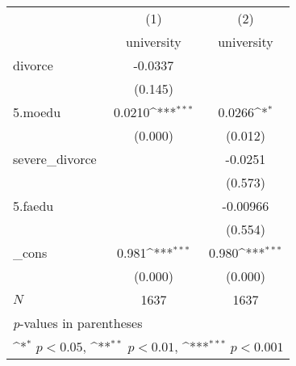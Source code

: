 {
\def\sym#1{\ifmmode^{#1}\else\(^{#1}\)\fi}
\begin{tabular}{l*{2}{c}}
\hline\hline
            &\multicolumn{1}{c}{(1)}&\multicolumn{1}{c}{(2)}\\
            &\multicolumn{1}{c}{university}&\multicolumn{1}{c}{university}\\
\hline
divorce     &     -0.0337         &                     \\
            &     (0.145)         &                     \\
[1em]
5.moedu     &      0.0210\sym{***}&      0.0266\sym{*}  \\
            &     (0.000)         &     (0.012)         \\
[1em]
severe\_divorce&                     &     -0.0251         \\
            &                     &     (0.573)         \\
[1em]
5.faedu     &                     &    -0.00966         \\
            &                     &     (0.554)         \\
[1em]
\_cons      &       0.981\sym{***}&       0.980\sym{***}\\
            &     (0.000)         &     (0.000)         \\
\hline
\(N\)       &        1637         &        1637         \\
\hline\hline
\multicolumn{3}{l}{\footnotesize \textit{p}-values in parentheses}\\
\multicolumn{3}{l}{\footnotesize \sym{*} \(p<0.05\), \sym{**} \(p<0.01\), \sym{***} \(p<0.001\)}\\
\end{tabular}
}
